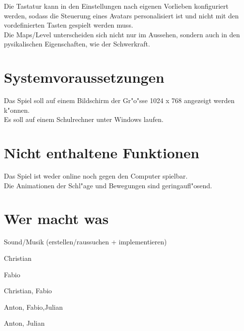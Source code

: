 \documentclass[a4paper, 11pt]{article}
\begin{document}
    \noindent
    Die Tastatur kann in den Einstellungen nach eigenen Vorlieben konfiguriert werden, sodass die Steuerung eines Avatars
    personalisiert ist und nicht mit den vordefinierten Tasten gespielt werden muss.\\

    \noindent
    Die Maps/Level unterscheiden sich nicht nur im Aussehen, sondern auch in den pysikalischen Eigenschaften, wie der
    Schwerkraft.

    \section{Systemvoraussetzungen}\label{sec:systemvorraussetungen}

    Das Spiel soll auf einem Bildschirm der Gr"o"ss{}e 1024 x 768 angezeigt werden k"onnen.\\

    \noindent
    Es soll auf einem Schulrechner unter Windows laufen.

    \section{Nicht enthaltene Funktionen}\label{sec:kann-nicht}

    Das Spiel ist weder online noch gegen den Computer spielbar.\\

    \noindent
    Die Animationen der Schl"age und Bewegungen sind geringaufl"osend.

    \section{Wer macht was}\label{sec:wer-macht-was}
    
    \begin{labeling}{Sound/Musik (erstellen/raussuchen + implementieren)}
        \item [Graphiken] Christian
        \item [Sound/Musik (erstellen/raussuchen + implementieren)] Fabio
        \item [Start-/Ladescreen] Christian, Fabio
        \item [GUI f"ur den Spielscreen] Anton, Fabio,\newline Julian
        \item [Physik (+Model)] Anton, Julian
    \end{labeling}
    
\end{document}
